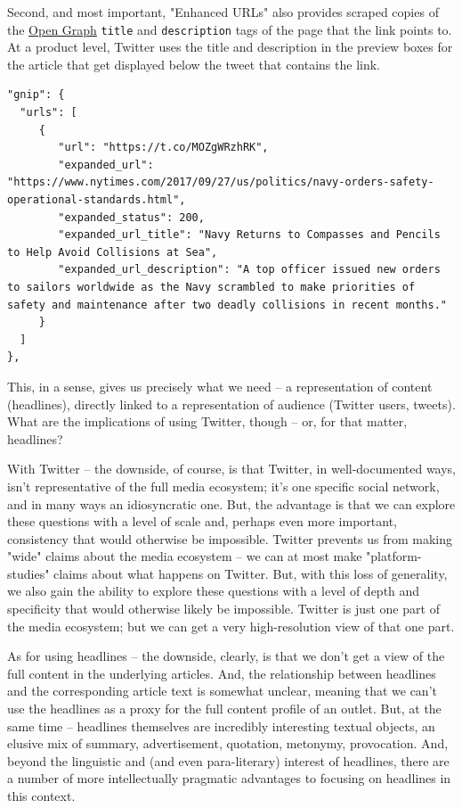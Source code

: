 \documentclass{scrartcl}
\begin{document}
Second, and most important, "Enhanced URLs" also provides scraped copies of the \href{http://ogp.me/}{Open Graph} \texttt{title} and \texttt{description} tags of the page that the link points to. At a product level, Twitter uses the title and description in the preview boxes for the article that get displayed below the tweet that contains the link.

\begin{lstlisting}
"gnip": {
  "urls": [
     {
        "url": "https://t.co/MOZgWRzhRK",
        "expanded_url": "https://www.nytimes.com/2017/09/27/us/politics/navy-orders-safety-operational-standards.html",
        "expanded_status": 200,
        "expanded_url_title": "Navy Returns to Compasses and Pencils to Help Avoid Collisions at Sea",
        "expanded_url_description": "A top officer issued new orders to sailors worldwide as the Navy scrambled to make priorities of safety and maintenance after two deadly collisions in recent months."
     }
  ]
},
\end{lstlisting}

This, in a sense, gives us precisely what we need -- a representation of content (headlines), directly linked to a representation of audience (Twitter users, tweets). What are the implications of using Twitter, though -- or, for that matter, headlines?

With Twitter -- the downside, of course, is that Twitter, in well-documented ways, isn't representative of the full media ecosystem; it's one specific social network, and in many ways an idiosyncratic one. But, the advantage is that we can explore these questions with a level of scale and, perhaps even more important, consistency that would otherwise be impossible. Twitter prevents us from making "wide" claims about the media ecosystem -- we can at most make "platform-studies" claims about what happens on Twitter. But, with this loss of generality, we also gain the ability to explore these questions with a level of depth and specificity that would otherwise likely be impossible. Twitter is just one part of the media ecosystem; but we can get a very high-resolution view of that one part.

As for using headlines -- the downside, clearly, is that we don't get a view of the full content in the underlying articles. And, the relationship between headlines and the corresponding article text is somewhat unclear, meaning that we can't use the headlines as a proxy for the full content profile of an outlet. But, at the same time -- headlines themselves are incredibly interesting textual objects, an elusive mix of summary, advertisement, quotation, metonymy,\cite{shie2011metaphors} provocation. And, beyond the linguistic and (and even para-literary) interest of headlines, there are a number of more intellectually pragmatic advantages to focusing on headlines in this context.
\end{document}
